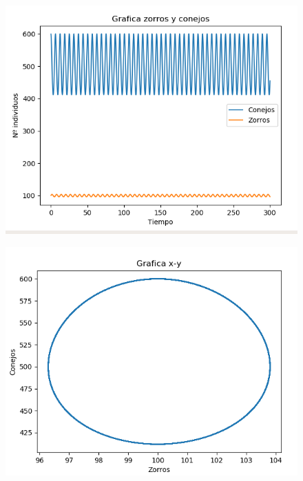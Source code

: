 \documentclass[]{article}
\begin{document}
\begin{enumerate}
\begin{figure}[H]
	\end{figure}
	\begin{figure}[H]
		\centering
		\includegraphics[width=1\linewidth]{screenshot005}
		\caption{}
		\label{fig:screenshot005}
	\end{figure}
	\begin{figure}[H]
		\centering
		\includegraphics[width=1\linewidth]{screenshot006}
		
	\end{figure}
	
\end{enumerate}
\end{document}

